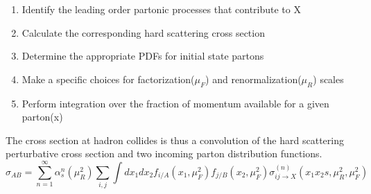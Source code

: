 \begin{enumerate}
	\item Identify the leading order partonic processes that contribute to X
	\item Calculate the corresponding hard scattering cross section
	\item Determine the appropriate PDFs for initial state partons
	\item Make a specific choices for factorization($\mu_F$) and renormalization($\mu_R$) scales
	\item Perform integration over the fraction of momentum available for a given parton(x)  
\end{enumerate}
The cross section at hadron collides is thus a convolution of the hard scattering perturbative cross section and two incoming parton distribution functions.
\begin{equation}
\sigma_{AB} = \sum\limits_{n=1}^{\infty} \alpha_{s}^{n}(\mu_{R}^2)\sum\limits_{i,j} \int dx_1 dx_2 f_{i/A}(x_1,\mu_{F}^2) f_{j/B}(x_2,\mu_{F}^2) \sigma_{ij \rightarrow X}^{(n)}(x_1 x_2s,\mu_{R}^2,\mu_{F}^2)
 \label{eq:xsec}
\end{equation} 	

